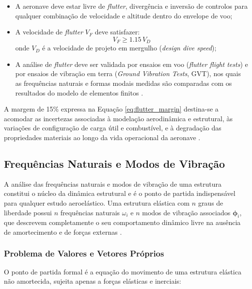 \documentclass[a4paper,fleqn]{cas-sc}
\begin{document}
\begin{itemize}
    \item A aeronave deve estar livre de \textit{flutter}, divergência e inversão de controlos para qualquer combinação de velocidade e altitude dentro do envelope de voo;
    \item A velocidade de \textit{flutter} $V_F$ deve satisfazer:
    \begin{equation}
        V_F \geq 1.15 \, V_D
        \label{eq:flutter_margin}
    \end{equation}
    \noindent onde $V_D$ é a velocidade de projeto em mergulho 
    (\textit{design dive speed});
    \item A análise de \textit{flutter} deve ser validada por ensaios em voo (\textit{flutter flight tests}) e por ensaios de vibração em terra (\textit{Ground Vibration Tests}, GVT), nos quais as frequências naturais e formas modais medidas são comparadas com os resultados do modelo de elementos finitos \cite{Ewins2000}.
\end{itemize}

A margem de 15\% expressa na Equação \eqref{eq:flutter_margin} destina-se a acomodar as incertezas associadas à modelação aerodinâmica e estrutural, às variações de configuração de carga útil e combustível, e à degradação das propriedades materiais ao longo da vida operacional da aeronave \cite{Wright2015}.


\subsection{Frequências Naturais e Modos de Vibração}

A análise das frequências naturais e modos de vibração de uma estrutura constitui o núcleo da dinâmica estrutural e é o ponto de partida indispensável para qualquer estudo aeroelástico. Uma estrutura elástica com $n$ graus de liberdade possui $n$ frequências naturais $\omega_i$ e $n$ modos de vibração associados $\boldsymbol{\phi}_i$, que descrevem completamente o seu comportamento dinâmico livre na ausência de amortecimento e de forças externas \cite{Craig2006, Clough1993}.

\subsubsection{Problema de Valores e Vetores Próprios}

O ponto de partida formal é a equação do movimento de uma estrutura elástica não amortecida, sujeita apenas a forças elásticas e inerciais:
\end{document}
